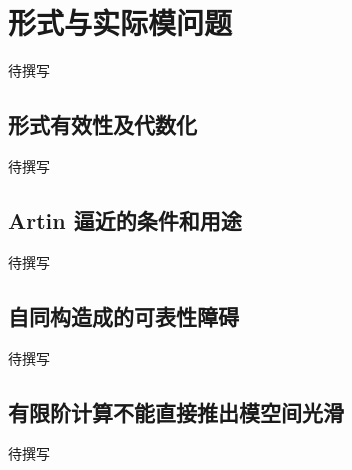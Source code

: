 
% 
% 
% 

\section{形式与实际模问题}
\label{g5:sec:3205}

待撰写

\subsection{形式有效性及代数化}
\label{g5:subsec:3205:01}
待撰写

\subsection{Artin 逼近的条件和用途}
\label{g5:subsec:3205:02}
待撰写

\subsection{自同构造成的可表性障碍}
\label{g5:subsec:3205:03}
待撰写

\subsection{有限阶计算不能直接推出模空间光滑}
\label{g5:subsec:3205:04}
待撰写
